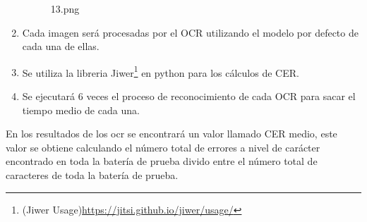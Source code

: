 \begin{enumerate}
\begin{figure}[H]
		\caption{13.png}
		\label{fig:13.png}
	\end{figure}
	\item Cada imagen será procesadas por el OCR utilizando el modelo por defecto de cada una de ellas.  
	\item Se utiliza la libreria Jiwer\footnote{(Jiwer Usage)\url {https://jitsi.github.io/jiwer/usage/}} en python para los cálculos de CER.
	\item Se ejecutará 6 veces el proceso de reconocimiento de cada OCR para sacar el tiempo medio de cada una.
\end{enumerate}


En los resultados de los ocr se encontrará un valor llamado CER medio, este valor se obtiene calculando el número total de errores a nivel de carácter encontrado en toda la batería de prueba divido entre el número total de caracteres de toda la batería de prueba.

